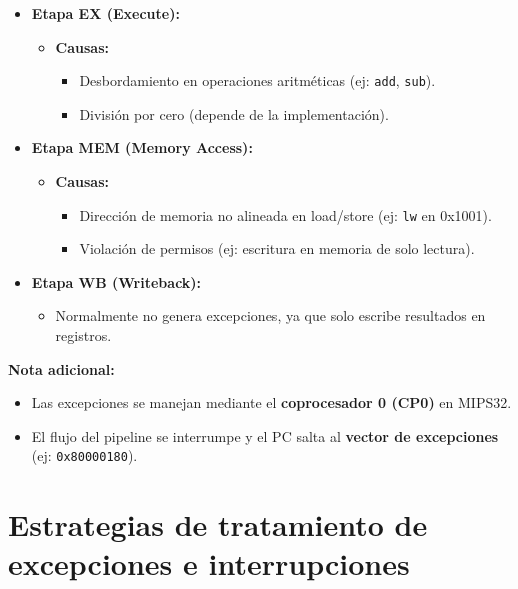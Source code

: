 \documentclass{article}
\begin{document}
\begin{enumerate}[label=\alph*)]
\begin{itemize}
        \item \textbf{Etapa EX (Execute):}
        \begin{itemize}
            \item \textbf{Causas:}
            \begin{itemize}
                \item Desbordamiento en operaciones aritméticas (ej: \texttt{add}, \texttt{sub}).
                \item División por cero (depende de la implementación).
            \end{itemize}
        \end{itemize}

        \item \textbf{Etapa MEM (Memory Access):}
        \begin{itemize}
            \item \textbf{Causas:}
            \begin{itemize}
                \item Dirección de memoria no alineada en load/store (ej: \texttt{lw} en 0x1001).
                \item Violación de permisos (ej: escritura en memoria de solo lectura).
            \end{itemize}
        \end{itemize}

        \item \textbf{Etapa WB (Writeback):}
        \begin{itemize}
            \item Normalmente no genera excepciones, ya que solo escribe resultados en registros.
        \end{itemize}
    \end{itemize}

    \textbf{Nota adicional:}
    \begin{itemize}
        \item Las excepciones se manejan mediante el \textbf{coprocesador 0 (CP0)} en MIPS32.
        \item El flujo del pipeline se interrumpe y el PC salta al \textbf{vector de excepciones} (ej: \texttt{0x80000180}).
    \end{itemize}
\end{enumerate}

\section{Estrategias de tratamiento de excepciones e interrupciones}
\end{document}
